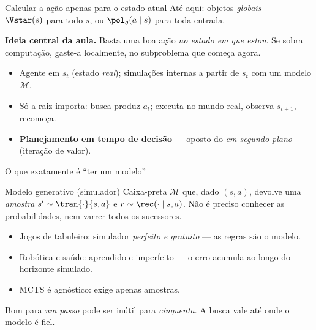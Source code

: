 \documentclass[aspectratio=169, 11pt]{beamer}
\newcommand{\Mmod}{\mathcal{M}}                 %
\begin{document}
\begin{frame}{Calcular a ação apenas para o estado atual}
  Até aqui: objetos \emph{globais} — $\Vstar(s)$ para todo $s$, ou $\pol_\theta(a\mid s)$ para toda entrada.

  \pause
  \begin{ideiabox}
    \textbf{Ideia central da aula.} Basta uma boa ação \emph{no estado em que estou}. Se sobra computação, gaste-a localmente, no subproblema que começa agora.
  \end{ideiabox}

  \pause
  \begin{itemize}
    \item Agente em $s_t$ (estado \emph{real}); simulações internas a partir de $s_t$ com um modelo $\Mmod$.
    \item Só a raiz importa: busca produz $a_t$; executa no mundo real, observa $s_{t+1}$, recomeça.
    \item \textbf{Planejamento em tempo de decisão} --- oposto do \emph{em segundo plano} (iteração de valor).
  \end{itemize}
\end{frame}

\begin{frame}{O que exatamente é ``ter um modelo''}
  \begin{defbox}{Modelo generativo (simulador)}
    Caixa-preta $\Mmod$ que, dado $(s,a)$, devolve uma \emph{amostra}
    $s' \sim \tran{\cdot}{s,a}$ e $r \sim \rec(\cdot\mid s,a)$. Não é preciso
    conhecer as probabilidades, nem varrer todos os sucessores.
  \end{defbox}

  \pause
  \begin{itemize}
    \item Jogos de tabuleiro: simulador \emph{perfeito e gratuito} — as regras são o modelo.
    \item Robótica e saúde: aprendido e imperfeito --- o erro acumula ao longo do horizonte simulado.
    \item MCTS é agnóstico: exige apenas amostras.
  \end{itemize}

  \pause
  \begin{alertabox}
    Bom para \emph{um passo} pode ser inútil para \emph{cinquenta}. A busca vale até onde o modelo é fiel.
  \end{alertabox}
\end{frame}
\end{document}
